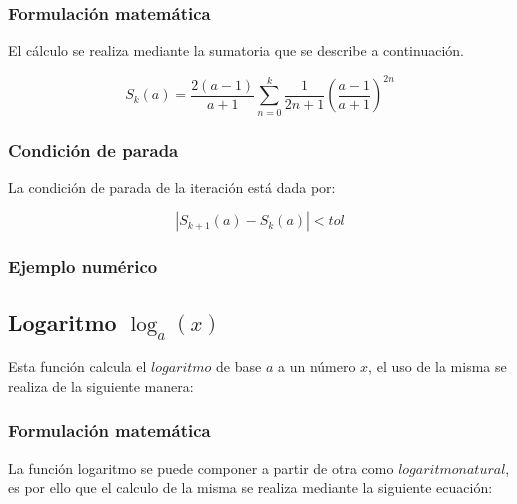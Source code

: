 \documentclass[10pt,a4paper]{article}
\begin{document}
	\begin{center}
	\end{center}
	
	\subsubsection{Formulación matemática}
	
	El cálculo se realiza mediante la sumatoria que se describe a continuación.
	
	\begin{equation}\label{key11}
		S_{k}(a) = \frac{2(a-1)}{a + 1}\sum_{n=0}^{k}\frac{1}{2n + 1}\left(\frac{a - 1}{a + 1}\right)^{2n}
	\end{equation}
	
	\subsubsection{Condición de parada}
	
	La condición de parada de la iteración está dada por: 
	
	\begin{equation}\label{key12}
		\left\lvert S_{k+1}(a) - S_{k}(a) \right\lvert < tol
	\end{equation}
	
	\subsubsection{Ejemplo numérico}
	
	\subsection{Logaritmo $\log_{a}(x)$}
	
	Esta función calcula el $logaritmo$ de base $a$ a un número $x$, el uso de la misma se realiza de la siguiente manera:
	
	\begin{center}
	\end{center}
	
	\subsubsection{Formulación matemática}
	
	La función logaritmo se puede componer a partir de otra como $logaritmo natural$, es por ello que el calculo de la misma se realiza mediante la siguiente ecuación:
	
\end{document}
